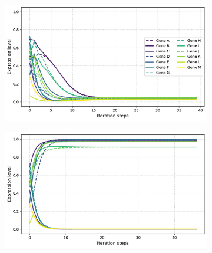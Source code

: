 \begin{figure}[H]
\begin{subfigure}[t]{0.48\textwidth}
\includegraphics[width=\textwidth]{alife/img/13genes_sigma_3.pdf}
\label{subfig:alife:sigma_3}
\end{subfigure}
\begin{subfigure}[t]{0.48\textwidth}
\includegraphics[width=\textwidth]{alife/img/13genes_sigma_2.pdf}
\label{subfig:alife:sigma_2}
\end{subfigure}
\vspace{-5mm}


\end{figure}
